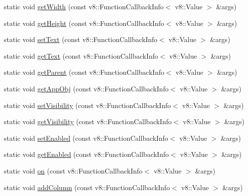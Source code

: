 \begin{DoxyCompactItemize}
static void \mbox{\hyperlink{class_rad_j_a_v_1_1_g_u_i_1_1_list_aa920e4eb88868f81944b1c380e95e5a2}{get\+Width}} (const v8\+::\+Function\+Callback\+Info$<$ v8\+::\+Value $>$ \&args)
\item 
static void \mbox{\hyperlink{class_rad_j_a_v_1_1_g_u_i_1_1_list_a437f9722c3d6a74970136b2b3f456a38}{get\+Height}} (const v8\+::\+Function\+Callback\+Info$<$ v8\+::\+Value $>$ \&args)
\item 
static void \mbox{\hyperlink{class_rad_j_a_v_1_1_g_u_i_1_1_list_ac0216e4bee01f0b90fdee3628ce9cf17}{set\+Text}} (const v8\+::\+Function\+Callback\+Info$<$ v8\+::\+Value $>$ \&args)
\item 
static void \mbox{\hyperlink{class_rad_j_a_v_1_1_g_u_i_1_1_list_a704ed0688804e1b0988beff0f421940c}{get\+Text}} (const v8\+::\+Function\+Callback\+Info$<$ v8\+::\+Value $>$ \&args)
\item 
static void \mbox{\hyperlink{class_rad_j_a_v_1_1_g_u_i_1_1_list_af8b8fea70f9a1ae6b344cb6ad79fc5a8}{get\+Parent}} (const v8\+::\+Function\+Callback\+Info$<$ v8\+::\+Value $>$ \&args)
\item 
static void \mbox{\hyperlink{class_rad_j_a_v_1_1_g_u_i_1_1_list_a185113275b73a69abe20c2c1b58f675f}{get\+App\+Obj}} (const v8\+::\+Function\+Callback\+Info$<$ v8\+::\+Value $>$ \&args)
\item 
static void \mbox{\hyperlink{class_rad_j_a_v_1_1_g_u_i_1_1_list_a73289ab4915bc72418f4d24b74f71935}{set\+Visibility}} (const v8\+::\+Function\+Callback\+Info$<$ v8\+::\+Value $>$ \&args)
\item 
static void \mbox{\hyperlink{class_rad_j_a_v_1_1_g_u_i_1_1_list_ae3948b7bd163811dec6ae1c299550d53}{get\+Visibility}} (const v8\+::\+Function\+Callback\+Info$<$ v8\+::\+Value $>$ \&args)
\item 
static void \mbox{\hyperlink{class_rad_j_a_v_1_1_g_u_i_1_1_list_a331ad8715ab7575888e7412e59f05544}{set\+Enabled}} (const v8\+::\+Function\+Callback\+Info$<$ v8\+::\+Value $>$ \&args)
\item 
static void \mbox{\hyperlink{class_rad_j_a_v_1_1_g_u_i_1_1_list_ab85949df71c5e95e84854c956f088671}{get\+Enabled}} (const v8\+::\+Function\+Callback\+Info$<$ v8\+::\+Value $>$ \&args)
\item 
static void \mbox{\hyperlink{class_rad_j_a_v_1_1_g_u_i_1_1_list_abb92575cc6bf4feac4746c43e06c2409}{on}} (const v8\+::\+Function\+Callback\+Info$<$ v8\+::\+Value $>$ \&args)
\item 
static void \mbox{\hyperlink{class_rad_j_a_v_1_1_g_u_i_1_1_list_a2c36615fa8c05dc1c8f98be4acd5b687}{add\+Column}} (const v8\+::\+Function\+Callback\+Info$<$ v8\+::\+Value $>$ \&args)

\end{DoxyCompactItemize}
